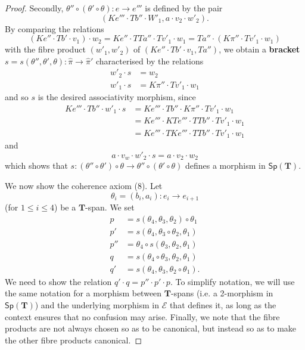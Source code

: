 \documentclass[fleqn]{article}
\newcommand{\oldpage}[1]{\marginpar{\footnotesize$\Big\vert$ \textit{p.~#1}}}
\newcommand{\unsure}[1]{{\color{purple}\textbf{#1}}}
\newcommand{\TT}{\mathbf{T}}
\newcommand{\cat}[1]{\mathcal{#1}}
\newcommand{\Cat}[1]{\mathsf{#1}}
\newcommand{\Sp}[1]{\Cat{Sp}(#1)}
\begin{document}
\begin{proof}
  \oldpage{251}
  Secondly, $\theta''\circ(\theta'\circ\theta)\colon e\to e'''$ is defined by the pair
  \[
    (Ke'''\cdot Tb''\cdot W'_1,
    a\cdot v_2\cdot w'_2).
  \]
  By comparing the relations
  \[
    (Ke''\cdot Tb'\cdot v_1)\cdot w_2
    = Ke''\cdot TTa''\cdot Tv'_1\cdot w_1
    = Ta''\cdot(K\pi''\cdot Tv'_1\cdot w_1)
  \]
  with the fibre product $(w'_1,w'_2)$ of $(Ke''\cdot Tb'\cdot v_1, Ta'')$, we obtain a \unsure{bracket} $s=s(\theta'',\theta',\theta)\colon\hat{\pi}\to\hat{\pi}'$ characterised by the relations
  \[
    \begin{aligned}
      w'_2\cdot s
      &= w_2
    \\w'_1\cdot s
      &= K\pi''\cdot Tv'_1\cdot w_1
    \end{aligned}
  \]
  and so $s$ is the desired associativity morphism, since
  \[
    \begin{aligned}
      Ke'''\cdot Tb''\cdot w'_1\cdot s
      &= Ke'''\cdot Tb''\cdot K\pi''\cdot Tv'_1\cdot w_1
    \\&=Ke'''\cdot KTe'''\cdot TTb''\cdot Tv'_1\cdot w_1
    \\&= Ke'''\cdot TKe'''\cdot TTb''\cdot Tv'_1\cdot w_1
    \end{aligned}
  \]
  and
  \[
    a\cdot v_w\cdot w'_2\cdot s
    = a\cdot v_2\cdot w_2
  \]
  which shows that $s\colon(\theta''\circ\theta')\circ\theta\to\theta''\circ(\theta'\circ\theta)$ defines a morphism in $\Sp{\TT}$.

  We now show the coherence axiom (8).
  Let
  \[
    \theta_i
    = (b_i,a_i)
    \colon e_i
    \to e_{i+1}
  \]
  (for $1\leqslant i\leqslant 4$) be a $\TT$-span.
  We set
  \[
    \begin{aligned}
      p
      &= s(\theta_4,\theta_3,\theta_2)\circ\theta_1
    \\p'
      &= s(\theta_4,\theta_3\circ\theta_2,\theta_1)
    \\p''
      &= \theta_4\circ s(\theta_3,\theta_2,\theta_1)
    \\q
      &= s(\theta_4\circ\theta_3,\theta_2,\theta_1)
    \\q'
      &= s(\theta_4,\theta_3,\theta_2\circ\theta_1).
    \end{aligned}
  \]
  We need to show the relation $q'\cdot q=p''\cdot p'\cdot p$.
  To simplify notation, we will use the same notation for a morphism between $\TT$-spans (i.e. a 2-morphism in $\Sp{\TT}$) and the underlying morphism in $\cat{E}$ that defines it, as long as the context ensures that no confusion may arise.
  Finally, we note that the fibre products are not always chosen so as to be canonical, but instead so as to make the other fibre products canonical.


\end{proof}
\end{document}
